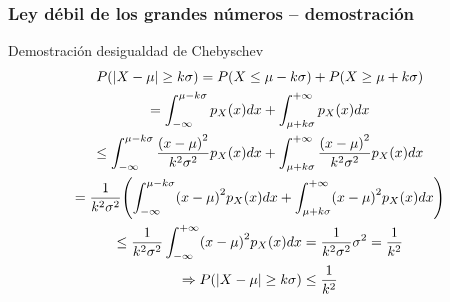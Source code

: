 \documentclass[table]{beamer}
\begin{document}
\begin{frame}
    \frametitle{Ley débil de los grandes números -- demostración}
    \begin{block}{Demostración desigualdad de Chebyschev}
        \begin{multline*}
            \prob{\vparens{X - \mu} \geq k \sigma}
            = \prob{X \leq \mu - k \sigma} + \prob{X \geq \mu + k \sigma}
            \\
            = \int_{- \infty}^{\mu - k \sigma} \ppdf{X}{x} dx
            + \int_{\mu + k \sigma}^{+ \infty} \ppdf{X}{x} dx
            \\
            \leq
            \int_{- \infty}^{\mu - k \sigma} \frac{\parens{x - \mu}^{2}}{k^{2}\sigma^{2}} \ppdf{X}{x} dx
            + \int_{\mu + k \sigma}^{+ \infty} \frac{\parens{x - \mu}^{2}}{k^{2}\sigma^{2}} \ppdf{X}{x} dx
            \\
            = \frac{1}{k^{2} \sigma^{2}} \parens{\int_{- \infty}^{\mu - k \sigma} \parens{x - \mu}^{2} \ppdf{X}{x} dx
            + \int_{\mu + k \sigma}^{+ \infty} \parens{x - \mu}^{2} \ppdf{X}{x} dx}
            \\
            \leq \frac{1}{k^{2} \sigma^{2}}
            \int_{- \infty}^{+ \infty} \parens{x - \mu}^{2} \ppdf{X}{x} dx
            = \frac{1}{k^{2} \sigma^{2}} \sigma^{2}
            = \frac{1}{k^{2}}
            \\
            \Rightarrow
            \prob{\vparens{X - \mu} \geq k \sigma} \leq \frac{1}{k^{2}}
        \end{multline*}
    \end{block}
\end{frame}
\end{document}
